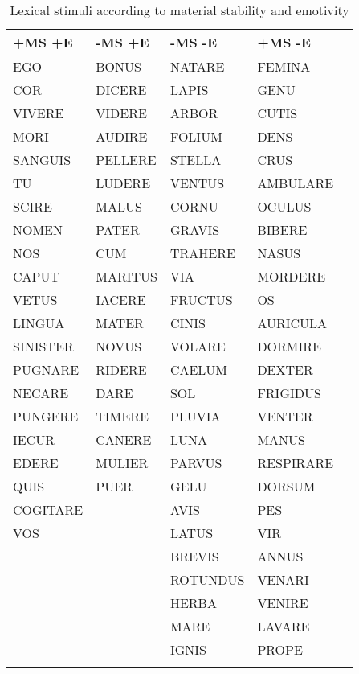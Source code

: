 \documentclass[output=paper,colorlinks,citecolor=brown,
]{langscibook}
\begin{document}
\begin{table}
\caption{Lexical stimuli according to material stability and emotivity}
\label{tab:1:latinwords}
 \begin{tabular}{lllll}
  \lsptoprule
            +MS +E &-MS +E &-MS -E &+MS -E\\
  \midrule
       EGO  &    BONUS &    NATARE      & FEMINA\\
       COR &   DICERE  &    LAPIS     & GENU\\
     VIVERE & VIDERE & ARBOR & CUTIS\\
     MORI & AUDIRE & FOLIUM & DENS\\
     SANGUIS & PELLERE & STELLA & CRUS\\
     TU & LUDERE & VENTUS & AMBULARE \\
     SCIRE & MALUS & CORNU & OCULUS \\
     NOMEN & PATER & GRAVIS & BIBERE \\
     NOS & CUM & TRAHERE & NASUS\\
     CAPUT & MARITUS & VIA & MORDERE \\
     VETUS & IACERE & FRUCTUS & OS \\
     LINGUA & MATER & CINIS & AURICULA \\
     SINISTER & NOVUS & VOLARE & DORMIRE \\
     PUGNARE & RIDERE & CAELUM & DEXTER \\
     NECARE & DARE & SOL & FRIGIDUS \\
     PUNGERE & TIMERE & PLUVIA & VENTER \\
     IECUR & CANERE & LUNA & MANUS \\
     EDERE & MULIER & PARVUS & RESPIRARE \\
     QUIS & PUER & GELU & DORSUM \\
     COGITARE & & AVIS & PES \\
     VOS & & LATUS & VIR \\
     & & BREVIS & ANNUS\\
     & & ROTUNDUS & VENARI \\
     & & HERBA & VENIRE \\
     & & MARE & LAVARE \\
     & & IGNIS & PROPE \\
  \lspbottomrule
 \end{tabular}
\end{table}
\end{document}
